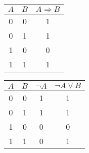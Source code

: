\documentclass[12pt]{article}
\theoremstyle{problem_style}
\begin{document}
\begin{figure}[h!]
    \begin{minipage}{0.45\linewidth}
        \centering
        \begin{tabular}{|c|c|c|}
        \hline
        $A$ & $B$ & $A \Rightarrow B$ \\
        \hline
        0 & 0 & 1 \\
        0 & 1 & 1 \\
        1 & 0 & 0 \\
        1 & 1 & 1 \\
        \hline
        \end{tabular}
    \end{minipage}
    \hspace{0.5cm}
    \begin{minipage}{0.45\linewidth}
        \centering
        \begin{tabular}{|c|c|c|c|}
        \hline
        $A$ & $B$ & $\lnot A$ & $\lnot A \lor B$ \\
        \hline
        0 & 0 & 1 & 1\\
        0 & 1 & 1 & 1\\
        1 & 0 & 0 & 0\\
        1 & 1 & 0 & 1\\
        \hline
        \end{tabular}
    \end{minipage}
\end{figure}
\end{document}
